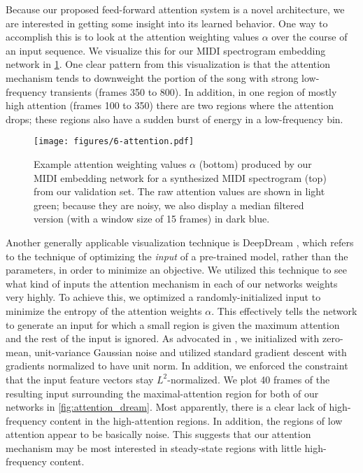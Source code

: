 Because our proposed feed-forward attention system is a novel architecture, we are interested in getting some insight into its learned behavior.
One way to accomplish this is to look at the attention weighting values $\alpha$ over the course of an input sequence.
We visualize this for our MIDI spectrogram embedding network in \cref{fig:attention}.
One clear pattern from this visualization is that the attention mechanism tends to downweight the portion of the song with strong low-frequency transients (frames 350 to 800).
In addition, in one region of mostly high attention (frames 100 to 350) there are two regions where the attention drops; these regions also have a sudden burst of energy in a low-frequency bin.

\begin{figure}
  \texttt{[image: figures/6-attention.pdf]}
  \caption[Example attention weighting]{Example attention weighting values $\alpha$ (bottom) produced by our MIDI embedding network for a synthesized MIDI spectrogram (top) from our validation set.
The raw attention values are shown in light green; because they are noisy, we also display a median filtered version (with a window size of 15 frames) in dark blue.}
  \label{fig:attention}
\end{figure}

Another generally applicable visualization technique is DeepDream \cite{mordvintsev2015inceptionism}, which refers to the technique of optimizing the {\em input} of a pre-trained model, rather than the parameters, in order to minimize an objective.
We utilized this technique to see what kind of inputs the attention mechanism in each of our networks weights very highly.
To achieve this, we optimized a randomly-initialized input to minimize the entropy of the attention weights $\alpha$.
This effectively tells the network to generate an input for which a small region is given the maximum attention and the rest of the input is ignored.
As advocated in \cite{mordvintsev2015inceptionism}, we initialized with zero-mean, unit-variance Gaussian noise and utilized standard gradient descent with gradients normalized to have unit norm.
In addition, we enforced the constraint that the input feature vectors stay $L^2$-normalized.
We plot 40 frames of the resulting input surrounding the maximal-attention region for both of our networks in \cref{fig:attention_dream}.
Most apparently, there is a clear lack of high-frequency content in the high-attention regions.
In addition, the regions of low attention appear to be basically noise.
This suggests that our attention mechanism may be most interested in steady-state regions with little high-frequency content.

